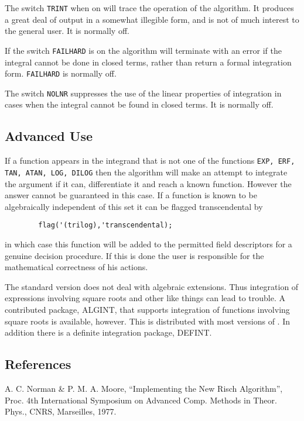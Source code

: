 The switch {\tt TRINT} when on will trace the operation of the algorithm. It
produces a great deal of output in a somewhat illegible form, and is not
of much interest to the general user. It is normally off.

If the switch {\tt FAILHARD} is on the algorithm will terminate with an
error if the integral cannot be done in closed terms, rather than return a
formal integration form. {\tt FAILHARD} is normally off.

The switch {\tt NOLNR} suppresses the use of the linear properties of
integration in cases when the integral cannot be found in closed terms.
It is normally off.

\subsection{Advanced Use}

If a function appears in the integrand that is not one of the functions
{\tt EXP, ERF, TAN, ATAN, LOG, DILOG}
then the algorithm will make an
attempt to integrate the argument if it can, differentiate it and reach a
known function.  However the answer cannot be guaranteed in this case.  If
a function is known to be algebraically independent of this set it can be
flagged transcendental by
\begin{verbatim}
        flag('(trilog),'transcendental);
\end{verbatim}
in which case this function will be added to the permitted field
descriptors for a genuine decision procedure. If this is done the user is
responsible for the mathematical correctness of his actions.

The standard version does not deal with algebraic extensions. Thus
integration of expressions involving square roots and other like things
can lead to trouble.  A contributed package, ALGINT, that supports
integration of functions involving square roots is available, however.
This is distributed with most versions of {\REDUCE}.  In addition there is
a definite integration package, DEFINT.

\subsection{References}

        A. C. Norman \& P. M. A. Moore, ``Implementing the New Risch
                Algorithm'', Proc. 4th International Symposium on Advanced
                Comp. Methods in Theor. Phys., CNRS, Marseilles, 1977.

